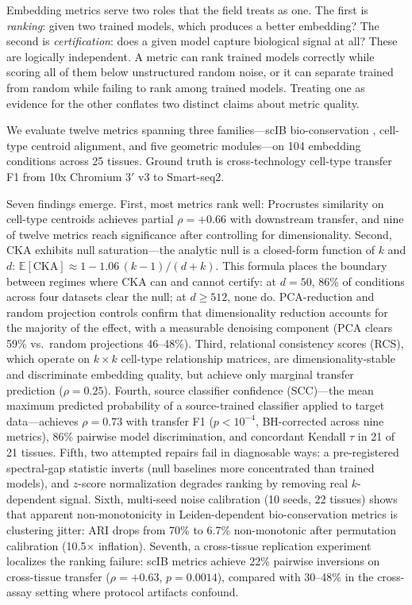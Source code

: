\documentclass[11pt]{article}
\begin{document}
Embedding metrics serve two roles that the field treats as one. The
first is \emph{ranking}: given two trained models, which produces a
better embedding? The second is \emph{certification}: does a given
model capture biological signal at all? These are logically independent.
A metric can rank trained models correctly while scoring all of them
below unstructured random noise, or it can separate trained from random
while failing to rank among trained models. Treating one as evidence for
the other conflates two distinct claims about metric quality.

We evaluate twelve metrics spanning three families---scIB
bio-conservation \citep{luecken2022scib}, cell-type centroid alignment,
and five geometric modules---on 104 embedding conditions across 25
tissues. Ground truth is cross-technology cell-type transfer F1 from
10x Chromium 3$'$ v3 to Smart-seq2.

Seven findings emerge. First, most metrics rank well: Procrustes
similarity on cell-type centroids achieves partial $\rho = +0.66$ with
downstream transfer, and nine of twelve metrics reach significance after
controlling for dimensionality. Second, CKA exhibits null saturation---the
analytic null is a closed-form function of $k$ and $d$:
$\mathbb{E}[\mathrm{CKA}] \approx 1 - 1.06\,(k{-}1)/(d{+}k)$. This
formula places the boundary between regimes where CKA can and cannot
certify: at $d = 50$, 86\% of conditions across four datasets clear the
null; at $d \geq 512$, none do. PCA-reduction and random projection
controls confirm that dimensionality reduction accounts for the majority
of the effect, with a measurable denoising component (PCA clears 59\%
vs.\ random projections 46--48\%). Third, relational consistency scores
(RCS), which operate on $k \times k$ cell-type relationship matrices,
are dimensionality-stable and discriminate embedding quality, but
achieve only marginal transfer prediction ($\rho = 0.25$). Fourth,
source classifier confidence (SCC)---the mean maximum predicted
probability of a source-trained classifier applied to target
data---achieves $\rho = 0.73$ with transfer F1 ($p < 10^{-4}$,
BH-corrected across nine metrics), 86\% pairwise model discrimination,
and concordant Kendall $\tau$ in 21 of 21 tissues. Fifth, two attempted
repairs fail in diagnosable ways: a pre-registered spectral-gap
statistic inverts (null baselines more concentrated than trained models),
and $z$-score normalization degrades ranking by removing real
$k$-dependent signal. Sixth, multi-seed noise calibration (10 seeds, 22
tissues) shows that apparent non-monotonicity in Leiden-dependent
bio-conservation metrics is clustering jitter: ARI drops from 70\% to
6.7\% non-monotonic after permutation calibration (10.5$\times$
inflation). Seventh, a cross-tissue replication experiment localizes the
ranking failure: scIB metrics achieve 22\% pairwise inversions on
cross-tissue transfer ($\rho = +0.63$, $p = 0.0014$), compared with
30--48\% in the cross-assay setting where protocol artifacts confound.
\end{document}
